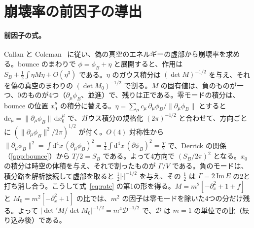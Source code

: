 \documentclass[a4paper,10pt]{ltjsarticle}
\newcommand{\dd}{\mathrm{d}}
\begin{document}
\section{崩壊率の前因子の導出}\label{app:prefactor}

\paragraph{前因子の式。}Callan と Coleman~\cite{callancoleman} に従い、偽の真空のエネルギーの虚部から崩壊率を求める。bounce のまわりで $\phi=\phi_B+\eta$ と展開すると、作用は $S_B+\frac12\int\eta M\eta+O(\eta^3)$ である。$\eta$ のガウス積分は $(\det M)^{-1/2}$ を与え、それを偽の真空のまわりの $(\det M_0)^{-1/2}$ で割る。$M$ の固有値は、負のものが一つ、0のものが4つ（$\partial_\mu\phi_B$、並進）で、残りは正である。零モードの積分は、bounce の位置 $x_0^\mu$ の積分に替える。$\eta=\sum_\mu c_\mu\,\partial_\mu\phi_B/\|\partial_\mu\phi_B\|$ とすると $\dd c_\mu=\|\partial_\mu\phi_B\|\,\dd x_0^\mu$ で、ガウス積分の規格化 $(2\pi)^{-1/2}$ と合わせて、方向ごとに $(\|\partial_\mu\phi_B\|^2/2\pi)^{1/2}$ が付く。$O(4)$ 対称性から $\|\partial_\mu\phi_B\|^2=\int\dd^4x\,(\partial_\mu\phi_B)^2=\frac14\int\dd^4x\,(\partial\phi_B)^2=\frac T2$ で、Derrick の関係（\ref{app:bounce}）から $T/2=S_B$ である。よって4方向で $(S_B/2\pi)^2$ となる。$x_0$ の積分は時空の体積を与え、それで割ったものが $\Gamma/V$ である。負のモードは、積分路を解析接続して虚部を取ると $\frac12|\cdot|^{-1/2}$ を与え、その $\frac12$ は $\Gamma=2\,\mathrm{Im}\,E$ の2と打ち消し合う。こうして式~\eqref{eq:rate} の第1の形を得る。$M=m^2[-\partial_x^2+1+f]$ と $M_0=m^2[-\partial_x^2+1]$ の比では、$m^2$ の因子は零モードを除いた4つの分だけ残る。よって $|\det'M/\det M_0|^{-1/2}=m^4\mathcal D^{-1/2}$ で、$\mathcal D$ は $m=1$ の単位での比（繰り込み後）である。
\end{document}
